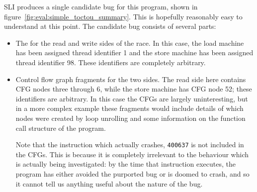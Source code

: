 SLI produces a single candidate bug for this program, shown in
figure~\ref{fig:eval:simple_toctou_summary}.  This is hopefully
reasonably easy to understand at this point.  The candidate bug
consists of several parts:

\begin{itemize}
\item The {\StateMachines} for the read and write sides of the race.
  In this case, the load machine has been assigned thread identifier 1
  and the store machine has been assigned thread identifier 98.  These
  identifiers are completely arbitrary.
\item Control flow graph fragments for the two sides.  The read side
  here contains CFG nodes three through 6, while the store machine has
  CFG node 52; these identifiers are arbitrary.  In this case the CFGs
  are largely uninteresting, but in a more complex example these
  fragments would include details of which nodes were created by loop
  unrolling and some information on the function call structure of the
  program.

  Note that the instruction which actually crashes, \verb|400637| is
  not included in the CFGs.  This is because it is completely
  irrelevant to the behaviour which is actually being investigated: by
  the time that instruction executes, the program has either avoided
  the purported bug or is doomed to crash, and so it cannot tell us
  anything useful about the nature of the bug.


\end{itemize}
